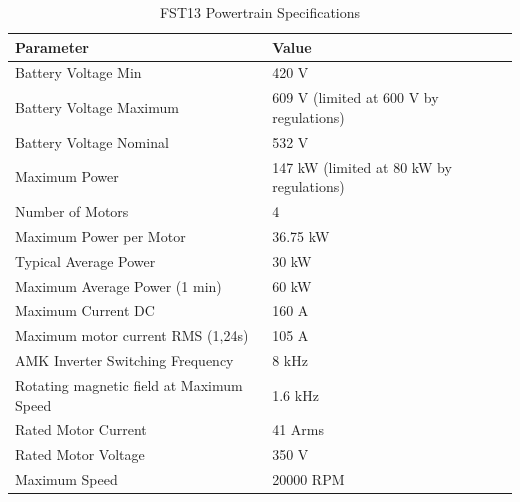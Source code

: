 \begin{table}[h]
	\centering
	\caption{FST13 Powertrain Specifications}
	\label{table:fst13_specs}%
	\renewcommand{\arraystretch}{1.2} %
		\begin{tabular}{l l}
			\toprule
			\textbf{Parameter}                 & \textbf{Value} \\ \toprule
			Battery Voltage Min                & 420 V          \\ \hline
			Battery Voltage Maximum            & 609 V (limited at 600 V by regulations)          \\ \hline
			Battery Voltage Nominal            & 532 V          \\ \hline
			Maximum Power                      & 147 kW (limited at 80 kW by regulations)          \\ \hline
			Number of Motors                   & 4              \\ \hline
			Maximum Power per Motor            & 36.75 kW       \\ \hline
			Typical Average Power              & 30 kW          \\ \hline
			Maximum Average Power (1 min)      & 60 kW          \\ \hline
			Maximum Current DC                 & 160 A          \\ \hline
			Maximum motor current RMS (1,24s)  & 105 A          \\ \hline
			AMK Inverter Switching Frequency   & 8 kHz          \\ \hline
			Rotating magnetic field at Maximum Speed   & 1.6 kHz        \\ \hline
			Rated Motor Current                & 41 Arms        \\ \hline
			Rated Motor Voltage                & 350 V          \\ \hline
			Maximum Speed                      & 20000 RPM      \\ \hline

\end{tabular}
\end{table}
